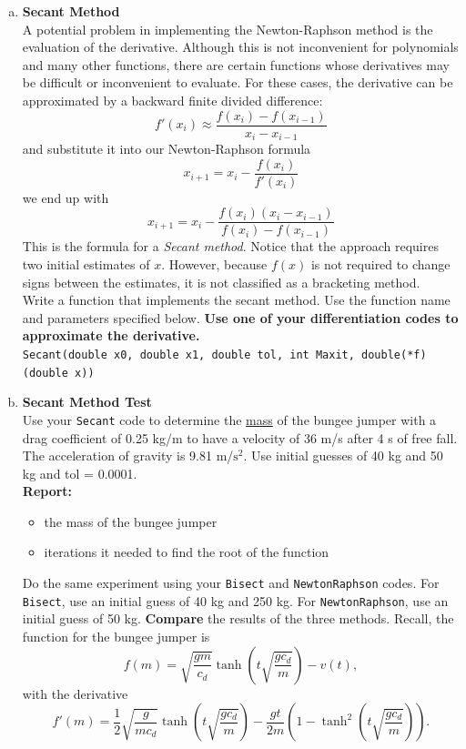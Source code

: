 \documentclass[11pt]{article}
\begin{document}
\begin{enumerate}[(a)]
	\item \textbf{Secant Method}\\
	A potential problem in implementing the Newton-Raphson method is
	the evaluation of the derivative. Although this is not inconvenient for polynomials and many other functions, there are certain functions whose derivatives may be difficult or inconvenient to evaluate. For these cases, the derivative can be approximated by a backward finite divided difference:
	$$ f'(x_i) \approx \frac{f(x_{i})-f(x_{i-1})}{x_{i}-x_{i-1}}$$
	and substitute it into our Newton-Raphson formula
	$$x_{i+1} = x_i - \frac{f(x_i)}{f'(x_i)}$$
	we end up with 
	$$x_{i+1} = x_i - \frac{f(x_i)\left(x_{i}-x_{i-1}\right)}{f(x_{i})-f(x_{i-1})} $$
	This is the formula for a \textit{Secant method}. Notice that the approach requires two initial estimates of $x$. However, because $f(x)$ is not required to change signs between the estimates, it is not classified as a bracketing method. \\\vspace{10pt}
	Write a function that implements the secant method. Use the function name and parameters specified below. \textbf{Use one of your differentiation codes to approximate the derivative.} \\\vspace{10pt}
	\texttt{Secant(double x0, double x1, double tol, int Maxit, double(*f)(double x))}
	
	\item \textbf{Secant Method Test}\\
	Use your \texttt{Secant} code to determine the \underline{mass} of the bungee jumper with a drag coefficient of 0.25 kg/m to have a velocity of 36 m/s after 4 s of free fall. The acceleration of gravity is 9.81 m/$\textrm{s}^2$. Use initial guesses of 40 kg and 50 kg and tol = 0.0001.\\ 
	\vspace{5pt}
	\textbf{Report:}
	\begin{itemize}
		\item the mass of the bungee jumper
		\item iterations it needed to find the root of the function
	\end{itemize}
	Do the same experiment using your \texttt{Bisect} and \texttt{NewtonRaphson} codes. For \texttt{Bisect}, use an initial guess of 40 kg and 250 kg. For \texttt{NewtonRaphson}, use an initial guess of 50 kg. \textbf{Compare} the results of the three methods. Recall, the function for the bungee jumper is
	$$f(m) = \sqrt{\frac{gm}{c_d}}\tanh\left(t\sqrt{\frac{gc_d}{m}}\right) -v(t), $$
	with the derivative
	$$f'(m) = \frac{1}{2}\sqrt{\frac{g}{mc_d}}\tanh\left(t\sqrt{\frac{gc_d}{m}}\right) - \frac{gt}{2m}\left(1-\tanh^2\left(t\sqrt{\frac{gc_d}{m}}\right)\right). $$ 
\end{enumerate}
\end{document}
